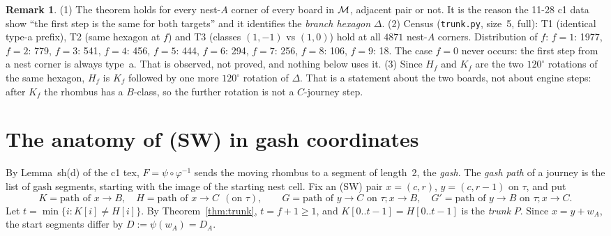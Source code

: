 \documentclass[11pt]{article}
\theoremstyle{definition}\newtheorem{definition}[theorem]{Definition}\newtheorem{remark}[theorem]{Remark}
\newcommand{\toB}{\!\to\! B}\newcommand{\toC}{\!\to\! C}\newcommand{\fa}{\mathfrak a}
\begin{document}
\begin{remark}
(1) The theorem holds for every nest-$A$ corner of every board in $\mathcal M$, adjacent pair or not. It is the reason the 11-28 c1 data show
``the first step is the same for both targets'' and it identifies the \emph{branch hexagon} $\Delta$. (2) Census (\texttt{trunk.py},
size~5, full): T1 (identical type-a prefix), T2 (same hexagon at $f$) and T3 (classes $(1,-1)$ vs $(1,0)$) hold at all $4871$ nest-$A$ corners.
Distribution of $f$: $f=1$: 1977, $f=2$: 779, $f=3$: 541, $f=4$: 456, $f=5$: 444, $f=6$: 294, $f=7$: 256, $f=8$: 106, $f=9$: 18. The case $f=0$ never occurs: the first step from a nest corner is always type~a. That is observed, not proved,
and nothing below uses it.
(3) Since $H_f$ and $K_f$ are the two $120^\circ$ rotations of the same hexagon, $H_f$ is $K_f$ followed by one more $120^\circ$ rotation of $\Delta$. That is a statement about the two
boards, not about engine steps: after $K_f$ the rhombus has a $B$-class, so the further rotation is not a $C$-journey step.
\end{remark}

\section{The anatomy of (SW) in gash coordinates}\label{sec:anat}
By Lemma~sh(d) of the c1 tex, $F=\psi\circ\varphi^{-1}$ sends the moving rhombus to a segment of length~2, the \emph{gash}. The
\emph{gash path} of a journey is the list of gash segments, starting with the image of the starting nest cell. Fix an (SW) pair
$x=(c,r)$, $y=(c,r-1)$ on $\tau$, and put
\[K=\text{path of }x\toB,\quad H=\text{path of }x\toC\ \ (\text{on }\tau),\qquad
G=\text{path of }y\toC\text{ on }\tau;x\toB,\quad G'=\text{path of }y\toB\text{ on }\tau;x\toC.\]
Let $t=\min\{i:K[i]\ne H[i]\}$. By Theorem~\ref{thm:trunk}, $t=f+1\ge1$, and $K[0..t-1]=H[0..t-1]$ is the \emph{trunk} $P$.
Since $x=y+w_A$, the start segments differ by $D:=\psi(w_A)=D_A$.
\end{document}
